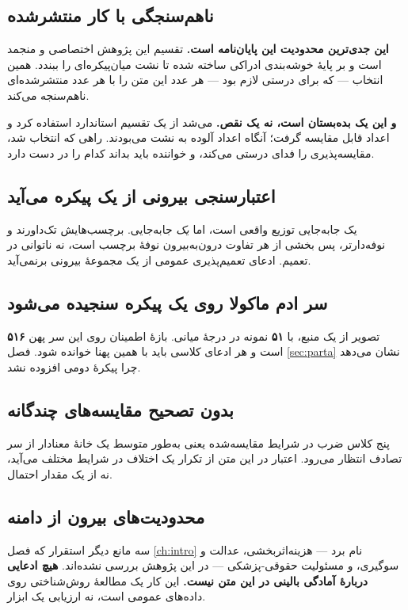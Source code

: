 \subsection{ناهم‌سنجگی با کار منتشرشده}

\textbf{این جدی‌ترین محدودیت این پایان‌نامه است.} تقسیم این پژوهش اختصاصی و منجمد است و بر
پایهٔ خوشه‌بندی ادراکی ساخته شده تا نشت میان‌پیکره‌ای را ببندد. همین انتخاب — که برای درستی
لازم بود — هر عدد این متن را با هر عدد منتشرشده‌ای ناهم‌سنجه می‌کند.

\textbf{و این یک بده‌بستان است، نه یک نقص.} می‌شد از یک تقسیم استاندارد استفاده کرد و اعداد
قابل مقایسه گرفت؛ آنگاه اعداد آلوده به نشت می‌بودند. راهی که انتخاب شد، مقایسه‌پذیری را
فدای درستی می‌کند، و خواننده باید بداند کدام را در دست دارد.

\subsection{اعتبارسنجی بیرونی از یک پیکره می‌آید}

 یک جابه‌جایی توزیع واقعی است، اما \emph{یک} جابه‌جایی. برچسب‌هایش تک‌داورند و
نوفه‌دارتر، پس بخشی از هر تفاوت درون‌به‌بیرون نوفهٔ برچسب است، نه ناتوانی در تعمیم. ادعای
تعمیم‌پذیری عمومی از یک مجموعهٔ بیرونی برنمی‌آید.

\subsection{سر ادم ماکولا روی یک پیکره سنجیده می‌شود}

\textbf{\num{۵۱۶}} تصویر از یک منبع، با \textbf{\num{۵۱}} نمونه در درجهٔ میانی. بازهٔ اطمینان روی این سر
پهن است و هر ادعای کلاسی باید با همین پهنا خوانده شود. فصل \ref{sec:parta} نشان می‌دهد چرا
پیکرهٔ دومی افزوده نشد.

\subsection{بدون تصحیح مقایسه‌های چندگانه}

پنج کلاس ضرب در شرایط مقایسه‌شده یعنی به‌طور متوسط یک خانهٔ معنادار از سر تصادف انتظار می‌رود.
اعتبار در این متن از تکرار یک اختلاف در شرایط مختلف می‌آید، نه از یک مقدار احتمال.

\subsection{محدودیت‌های بیرون از دامنه}

سه مانع دیگر استقرار که فصل \ref{ch:intro} نام برد — هزینه‌اثربخشی، عدالت و سوگیری، و مسئولیت
حقوقی-پزشکی \cite{ruamviboonsuk2024review} — در این پژوهش بررسی نشده‌اند.
\textbf{هیچ ادعایی دربارهٔ آمادگی بالینی در این متن نیست.} این کار یک مطالعهٔ روش‌شناختی روی
داده‌های عمومی است، نه ارزیابی یک ابزار.

